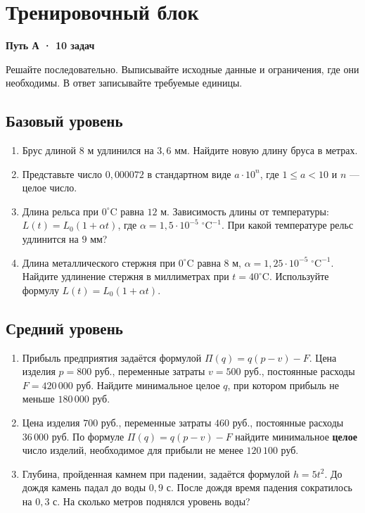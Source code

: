 \documentclass[a4paper,11pt]{article}
\begin{document}
\clearpage
\section*{Тренировочный блок}
\textcolor{accent}{\textbf{Путь А · 10 задач}}
\par
Решайте последовательно. Выписывайте исходные данные и ограничения,
где они необходимы. В ответ записывайте требуемые единицы.

\subsection*{Базовый уровень}
\begin{enumerate}[label=\textbf{\arabic*.}]
\item Брус длиной \(8\) м удлинился на \(3{,}6\) мм.
      Найдите новую длину бруса в метрах.
\item Представьте число \(0{,}000072\) в стандартном виде
      \(a\cdot10^n\), где \(1\le a<10\) и \(n\) --- целое число.
\item Длина рельса при \(0^\circ\mathrm C\) равна \(12\) м.
      Зависимость длины от температуры:
      \(L(t)=L_0(1+\alpha t)\), где
      \(\alpha=1{,}5\cdot10^{-5}\;{}^\circ\mathrm C^{-1}\).
      При какой температуре рельс удлинится на \(9\) мм?
\item Длина металлического стержня при \(0^\circ\mathrm C\) равна \(8\) м,
      \(\alpha=1{,}25\cdot10^{-5}\;{}^\circ\mathrm C^{-1}\).
      Найдите удлинение стержня в миллиметрах при \(t=40^\circ\mathrm C\).
      Используйте формулу \(L(t)=L_0(1+\alpha t)\).
\end{enumerate}

\subsection*{Средний уровень}
\begin{enumerate}[label=\textbf{\arabic*.},start=5]
\item Прибыль предприятия задаётся формулой
      \(\Pi(q)=q(p-v)-F\).
      Цена изделия \(p=800\) руб.,
      переменные затраты \(v=500\) руб.,
      постоянные расходы \(F=420\,000\) руб.
      Найдите минимальное целое \(q\), при котором
      прибыль не меньше \(180\,000\) руб.
\item Цена изделия \(700\) руб., переменные затраты \(460\) руб.,
      постоянные расходы \(36\,000\) руб.
      По формуле \(\Pi(q)=q(p-v)-F\) найдите минимальное
      \textbf{целое} число изделий, необходимое для прибыли
      не менее \(120\,100\) руб.
\item Глубина, пройденная камнем при падении, задаётся формулой
      \(h=5t^2\). До дождя камень падал до воды \(0{,}9\) с.
      После дождя время падения сократилось на \(0{,}3\) с.
      На сколько метров поднялся уровень воды?
\end{enumerate}
\end{document}
